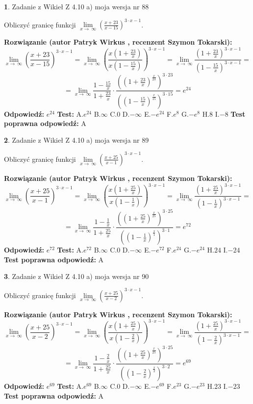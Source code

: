 \documentclass[12pt, a4paper]{article}
\theoremstyle{definition} %
\newtheorem{zad}{}
\newcommand{\zadStart}[1]{\begin{zad}#1\newline}
\newcommand{\zadStop}{\end{zad}}
\newcommand{\rozwStart}[2]{\noindent \textbf{Rozwiązanie (autor #1 , recenzent #2): }\newline}
\newcommand{\rozwStop}{\newline}
\newcommand{\odpStart}{\noindent \textbf{Odpowiedź:}\newline}
\newcommand{\odpStop}{\newline}
\newcommand{\testStart}{\noindent \textbf{Test:}\newline}
\newcommand{\testStop}{\newline}
\newcommand{\kluczStart}{\noindent \textbf{Test poprawna odpowiedź:}\newline}
\newcommand{\kluczStop}{\newline}
\begin{document}
\zadStart{Zadanie z Wikieł Z 4.10 a) moja wersja nr 88}

Obliczyć granicę funkcji  $\lim\limits_{x\to\ \infty}(\frac{x+23}{x-15})^{3\cdot x-1}$.
\zadStop
\rozwStart{Patryk Wirkus}{Szymon Tokarski}
$$\lim\limits_{x\to\ \infty}(\frac{x+23}{x-15})^{3\cdot x-1} = \lim\limits_{x\to\ \infty}(\frac{x(1+\frac{23}{x})}{x(1-\frac{15}{x})})^{3\cdot x-1}=\lim\limits_{x\to\ \infty}\frac{(1+\frac{23}{x})^{3\cdot x-1}}{(1-\frac{15}{x})^{3\cdot x-1}}=$$
$$=\lim\limits_{x\to\ \infty}\frac{1-\frac{15}{x}}{1+\frac{23}{x}}\cdot\frac{((1+\frac{23}{x})^{\frac{x}{23}})^{3\cdot23}}{((1-\frac{15}{x})^{\frac{x}{15}})^{3\cdot15}}=e^{24}$$
\rozwStop
\odpStart
$e^{24}$
\odpStop
\testStart
A.$e^{24}$ B.$\infty$ C.$0$ D.$-\infty$ E.$-e^{24}$
F.$e^{8}$ G.$-e^{8}$
H.$8$
I.$-8$
\testStop
\kluczStart
A
\kluczStop



\zadStart{Zadanie z Wikieł Z 4.10 a) moja wersja nr 89}

Obliczyć granicę funkcji  $\lim\limits_{x\to\ \infty}(\frac{x+25}{x-1})^{3\cdot x-1}$.
\zadStop
\rozwStart{Patryk Wirkus}{Szymon Tokarski}
$$\lim\limits_{x\to\ \infty}(\frac{x+25}{x-1})^{3\cdot x-1} = \lim\limits_{x\to\ \infty}(\frac{x(1+\frac{25}{x})}{x(1-\frac{1}{x})})^{3\cdot x-1}=\lim\limits_{x\to\ \infty}\frac{(1+\frac{25}{x})^{3\cdot x-1}}{(1-\frac{1}{x})^{3\cdot x-1}}=$$
$$=\lim\limits_{x\to\ \infty}\frac{1-\frac{1}{x}}{1+\frac{25}{x}}\cdot\frac{((1+\frac{25}{x})^{\frac{x}{25}})^{3\cdot25}}{((1-\frac{1}{x})^{\frac{x}{1}})^{3\cdot1}}=e^{72}$$
\rozwStop
\odpStart
$e^{72}$
\odpStop
\testStart
A.$e^{72}$ B.$\infty$ C.$0$ D.$-\infty$ E.$-e^{72}$
F.$e^{24}$ G.$-e^{24}$
H.$24$
I.$-24$
\testStop
\kluczStart
A
\kluczStop



\zadStart{Zadanie z Wikieł Z 4.10 a) moja wersja nr 90}

Obliczyć granicę funkcji  $\lim\limits_{x\to\ \infty}(\frac{x+25}{x-2})^{3\cdot x-1}$.
\zadStop
\rozwStart{Patryk Wirkus}{Szymon Tokarski}
$$\lim\limits_{x\to\ \infty}(\frac{x+25}{x-2})^{3\cdot x-1} = \lim\limits_{x\to\ \infty}(\frac{x(1+\frac{25}{x})}{x(1-\frac{2}{x})})^{3\cdot x-1}=\lim\limits_{x\to\ \infty}\frac{(1+\frac{25}{x})^{3\cdot x-1}}{(1-\frac{2}{x})^{3\cdot x-1}}=$$
$$=\lim\limits_{x\to\ \infty}\frac{1-\frac{2}{x}}{1+\frac{25}{x}}\cdot\frac{((1+\frac{25}{x})^{\frac{x}{25}})^{3\cdot25}}{((1-\frac{2}{x})^{\frac{x}{2}})^{3\cdot2}}=e^{69}$$
\rozwStop
\odpStart
$e^{69}$
\odpStop
\testStart
A.$e^{69}$ B.$\infty$ C.$0$ D.$-\infty$ E.$-e^{69}$
F.$e^{23}$ G.$-e^{23}$
H.$23$
I.$-23$
\testStop
\kluczStart
A
\kluczStop
\end{document}
